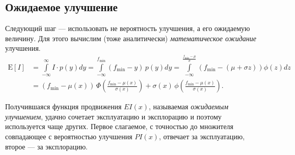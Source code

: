 \documentclass[11pt,a4paper]{article}
\begin{document}
    \hypertarget{ux43eux436ux438ux434ux430ux435ux43cux43eux435-ux443ux43bux443ux447ux448ux435ux43dux438ux435}{%
\subsection{Ожидаемое
улучшение}\label{ux43eux436ux438ux434ux430ux435ux43cux43eux435-ux443ux43bux443ux447ux448ux435ux43dux438ux435}}

Следующий шаг --- использовать не вероятность улучшения, а его ожидаемую
величину. Для этого вычислим (тоже аналитически) \emph{математическое
ожидание} улучшения. \[
\begin{split}
  \mathrm{E}[I]
  &= \int \limits_{-\infty}^{\infty} I \cdot p(y) dy
  = \int \limits_{-\infty}^{f_\mathrm{min}} (f_\mathrm{min} - y)\,p(y) dy
  = \int \limits_{-\infty}^{\frac{f_\mathrm{min}-\mu}{\sigma}} \left( f_\mathrm{min} - (\mu+\sigma z) \right) \phi(z) dz \\
  &= \left( f_\mathrm{min} - \mu(x) \right) \, \Phi\left(\frac{f_\mathrm{min} - \mu(x)}{\sigma(x)}\right) + \sigma(x) \, \phi\left(\frac{f_\mathrm{min} - \mu(x)}{\sigma(x)}\right).
\end{split}
\]

Получившаяся функция продвижения \(EI(x)\), называемая \emph{ожидаемым
улучшением}, удачно сочетает эксплуатацию и эксплорацию и поэтому
используется чаще других. Первое слагаемое, с точностью до множителя
совпадающее с вероятностью улучшения \(PI(x)\), отвечает за
эксплуатацию, второе --- за эксплорацию.
\end{document}
